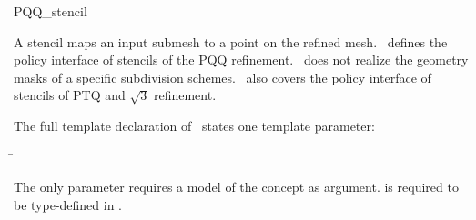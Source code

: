 
\ccRefPageBegin



\begin{ccRefClass}{PQQ_stencil}

\ccDefinition

A stencil maps an input submesh to a point on the refined 
mesh. \ccClassTemplateName\ defines the policy interface of 
stencils of the PQQ refinement. \ccClassTemplateName\ does not
realize the geometry masks of a specific subdivision schemes.
\ccClassTemplateName\ also covers the policy interface 
of stencils of PTQ and $\sqrt{3}$ refinement.




\ccParameters

The full template declaration of \ccClassTemplateName\ states one
template parameter:

\begin{tabbing}
 \= 
\end{tabbing}
   
The only parameter requires a model of 
the  concept as argument.  
is required to be type-defined in .


\end{ccRefClass}
